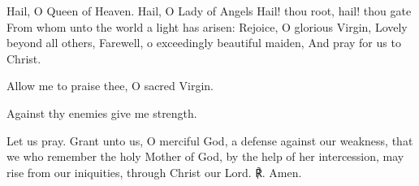 \begin{otherlanguage}{english}\noindent Hail, O Queen of Heaven.
Hail, O Lady of Angels
Hail! thou root, hail! thou gate
From whom unto the world a light has arisen:
Rejoice, O glorious Virgin,
Lovely beyond all others,
Farewell, o exceedingly beautiful maiden,
And pray for us to Christ.

\noindent \vv Allow me to praise thee, O sacred Virgin.

\noindent \rr Against thy enemies give me strength.

\noindent Let us pray. Grant unto us, O merciful God, a defense against our weakness, that we who remember the holy Mother of God, by the help of her intercession, may rise from our iniquities, through Christ our Lord. ℟. Amen.
\end{otherlanguage}